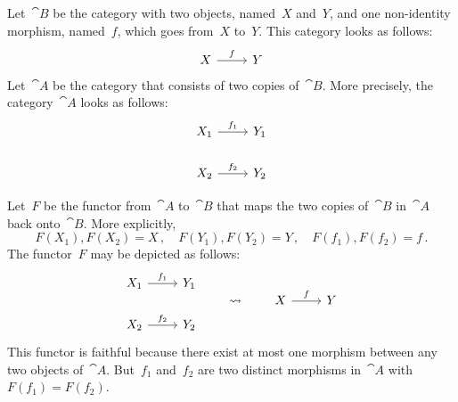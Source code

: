 \subsection{}

Let~$\cat{B}$ be the category with two objects, named~$X$ and~$Y$, and one non-identity morphism, named~$f$, which goes from~$X$ to~$Y$.
This category looks as follows:
\[
	\begin{tikzcd}
		X
		\arrow{r}[above]{f}
		&
		Y
	\end{tikzcd}
\]
Let~$\cat{A}$ be the category that consists of two copies of~$\cat{B}$.
More precisely, the category~$\cat{A}$ looks as follows:
\[
	\begin{tikzcd}[row sep = normal]
		X_1
		\arrow{r}[above]{f_1}
		&
		Y_1
		\\
		X_2
		\arrow{r}[above]{f_2}
		&
		Y_2
	\end{tikzcd}
\]

Let~$F$ be the functor from~$\cat{A}$ to~$\cat{B}$ that maps the two copies of~$\cat{B}$ in~$\cat{A}$ back onto~$\cat{B}$.
More explicitly,
\[
	F(X_1), F(X_2) = X \,,
	\quad
	F(Y_1), F(Y_2) = Y \,,
	\quad
	F(f_1), F(f_2) = f \,.
\]
The functor~$F$ may be depicted as follows:
\[
	\begin{tikzcd}[row sep = normal]
		X_1
		\arrow{r}[above]{f_1}
		&
		Y_1
		\\
		X_2
		\arrow{r}[above]{f_2}
		&
		Y_2
	\end{tikzcd}
	\qquad\leadsto\qquad
	\begin{tikzcd}
		X
		\arrow{r}[above]{f}
		&
		Y
	\end{tikzcd}
\]
This functor is faithful because there exist at most one morphism between any two objects of~$\cat{A}$.
But~$f_1$ and~$f_2$ are two distinct morphisms in~$\cat{A}$ with~$F(f_1) = F(f_2)$.
